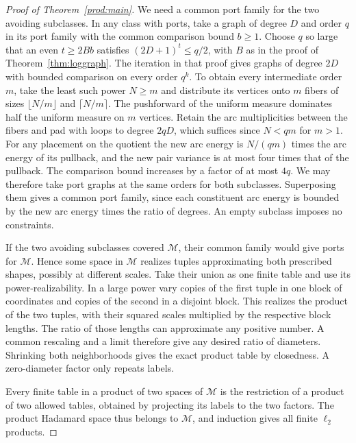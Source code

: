 \begin{proof}[Proof of Theorem~\ref{prod:main}]
We need a common port family for the two avoiding subclasses. In
any class with ports, take a graph of degree $D$ and order $q$ in its
port family with the common comparison bound $b\ge1$. Choose $q$ so
large that an even $t\ge2Bb$ satisfies $(2D+1)^t\le q/2$, with $B$
as in the proof of Theorem~\ref{thm:loggraph}. The iteration in that
proof gives graphs of degree $2D$ with bounded comparison on every
order $q^k$. To obtain every intermediate order $m$, take the least
such power $N\ge m$ and distribute its vertices onto $m$ fibers of
sizes $\lfloor N/m\rfloor$ and $\lceil N/m\rceil$. The pushforward
of the uniform measure dominates half the uniform measure on $m$
vertices. Retain the arc multiplicities between the fibers and pad
with loops to degree $2qD$, which suffices since $N<qm$ for $m>1$.
For any placement on the quotient the new arc energy is $N/(qm)$
times the arc energy of its pullback, and the new pair variance is
at most four times that of the pullback. The comparison bound
increases by a factor of at most $4q$. We may therefore take port
graphs at the same orders for both subclasses. Superposing them gives
a common port family, since each constituent arc energy is bounded
by the new arc energy times the ratio of degrees. An empty subclass
imposes no constraints.

If the two avoiding subclasses covered $\mathcal M$, their common
family would give ports for $\mathcal M$. Hence some space in
$\mathcal M$ realizes tuples approximating both prescribed shapes,
possibly at different scales. Take their union as one finite table
and use its power-realizability. In a large power vary copies of the
first tuple in one block of coordinates and copies of the second in
a disjoint block. This realizes the product of the two tuples, with
their squared scales multiplied by the respective block lengths.
The ratio of those lengths can approximate any positive number.
A common rescaling and a limit therefore give any desired ratio of
diameters. Shrinking both neighborhoods gives the exact product table
by closedness. A zero-diameter factor only repeats labels.

Every finite table in a product of two spaces of $\mathcal M$ is the
restriction of a product of two allowed tables, obtained by projecting
its labels to the two factors. The product Hadamard space thus belongs
to $\mathcal M$, and induction gives all finite $\ell_2$ products.
\end{proof}
